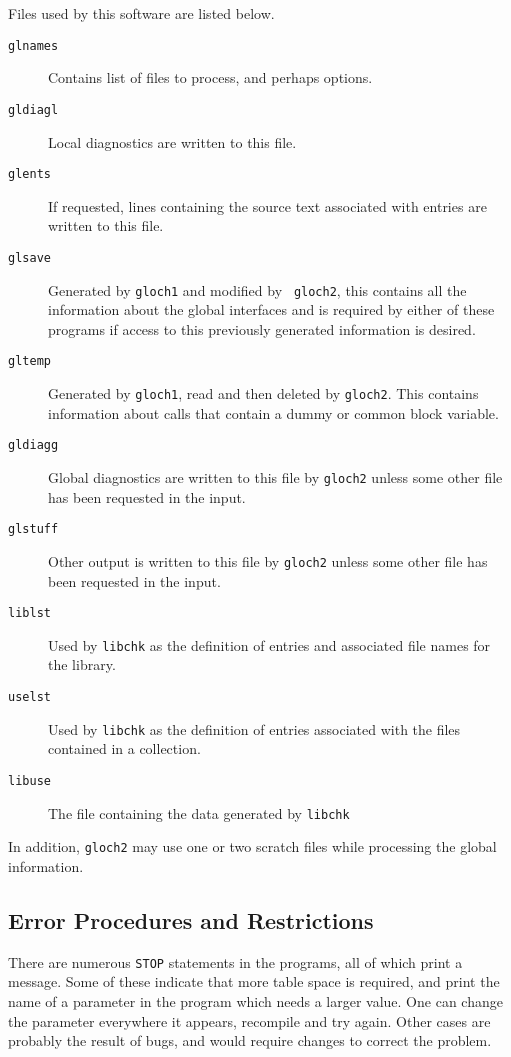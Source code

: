\documentclass[twoside]{MATH77}
\begin{document}
Files used by this software are listed below.\vspace{-5pt}
\begin{description}
\item[{\tt glnames}] Contains list of files to process, and perhaps
options.
\item[{\tt gldiagl}] Local diagnostics are written to this file.
\item[{\tt glents}] If requested, lines containing the source text
associated with entries are written to this file.
\item[{\tt glsave}] Generated by {\tt gloch1} and modified by {\tt
gloch2}, this contains all the information about the global interfaces
and is required by either of these programs if access to this previously
generated information is desired.
\item[{\tt gltemp}] Generated by {\tt gloch1}, read and then deleted
by {\tt gloch2}.  This contains information about calls that contain a
dummy or common block variable.
\item[{\tt gldiagg}] Global diagnostics are written to this file
by {\tt gloch2} unless some other file has been requested in the input.
\item[{\tt glstuff}] Other output is written to this file by {\tt gloch2}
unless some other file has been requested in the input.
\item[\tt liblst] Used by {\tt libchk} as the definition of entries and
associated file names for the library.
\item[\tt uselst] Used by {\tt libchk} as the definition of entries
associated with the files contained in a collection.
\item[\tt libuse] The file containing the data generated by {\tt libchk}
\end{description}

In addition, {\tt gloch2} may use one or two scratch files while
processing the global information.

\subsection{Error Procedures and Restrictions}

There are numerous {\tt STOP} statements in the programs, all of which
print a message.  Some of these indicate that more table space is
required, and print the name of a parameter in the program which needs a
larger value.  One can change the parameter everywhere it appears,
recompile and try again.  Other cases are probably the result of bugs, and
would require changes to correct the problem.
\end{document}
